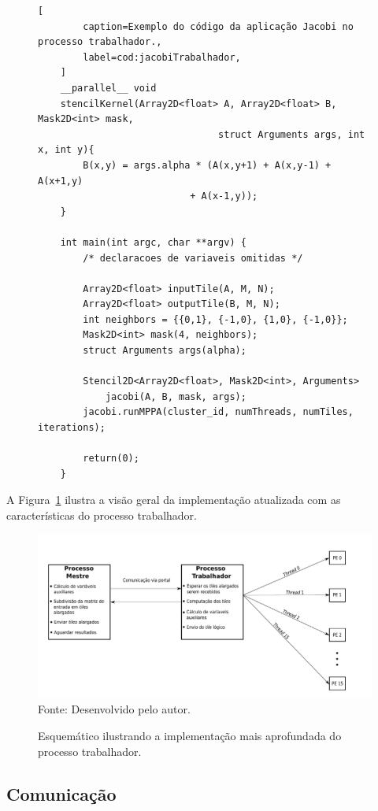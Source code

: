 \begin{figure}[t]
    \begin{lstlisting}[
		caption=Exemplo do código da aplicação Jacobi no processo trabalhador.,
		label=cod:jacobiTrabalhador,
	]
	__parallel__ void
	stencilKernel(Array2D<float> A, Array2D<float> B, Mask2D<int> mask,
								struct Arguments args, int x, int y){
		B(x,y) = args.alpha * (A(x,y+1) + A(x,y-1) + A(x+1,y)
                           + A(x-1,y));
	}

	int main(int argc, char **argv) {
		/* declaracoes de variaveis omitidas */

		Array2D<float> inputTile(A, M, N);
		Array2D<float> outputTile(B, M, N);
		int neighbors = {{0,1}, {-1,0}, {1,0}, {-1,0}};
		Mask2D<int> mask(4, neighbors);
		struct Arguments args(alpha);

		Stencil2D<Array2D<float>, Mask2D<int>, Arguments>
			jacobi(A, B, mask, args);
		jacobi.runMPPA(cluster_id, numThreads, numTiles, iterations);

		return(0);
	}
\end{lstlisting}
\end{figure}

A Figura~\ref{fig:visaoGeralTrabalhador} ilustra a visão geral da implementação
atualizada com as características do processo trabalhador.

\begin{figure}[t]
	\centering
    \caption{Esquemático ilustrando a implementação mais aprofundada do processo trabalhador.}
    \includegraphics[width=\textwidth, height=!]{figs/visaoGeralPSKELMPPATrabalhador.pdf} \\
    Fonte: Desenvolvido pelo autor.
    \label{fig:visaoGeralTrabalhador}
\end{figure}


\subsection{Comunicação}
\label{sec:comunicacao}

